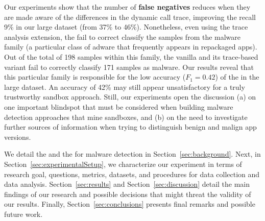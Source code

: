 Our experiments show that the number of {\bf false negatives} reduces when they are made aware of the
differences in the dynamic call trace, improving the recall 9\% in our large dataset (from 37\% to 46\%). 
Nonetheless, even using the trace analysis extension, the \mas fail to correct classify the samples
from the \gps malware family (a particular class of adware that frequently appears in repackaged apps).
Out of the total of 198 samples within this family, the vanilla \mas and its trace-based variant
fail to correctly classify 171 samples as malware. Our results reveal that this particular family is
responsible for the low accuracy ($F_1 = 0.42$) of the \mas in the large dataset. 
An accuracy of 42\% may still appear unsatisfactory for a truly trustworthy sandbox approach. Still, 
our experiments open the discussion (a) on one important blindspot that must be considered when building 
malware detection approaches that mine sandboxes, and (b) on the need to investigate further sources of
information when trying to distinguish benign and malign app versions.

We detail the \mas and the \mas for malware detection in
Section~\ref{sec:background}. Next, in Section~\ref{sec:experimentalSetup}, we
characterize our experiment in terms of research goal, questions, metrics, datasets, 
and procedures for data collection and data analysis. Section~\ref{sec:results} and
Section~\ref{sec:discussion} detail the main findings of our research and
possible decisions that might threat the validity of our results. Finally,
Section~\ref{sec:conclusions} presents final remarks and possible future
work.
